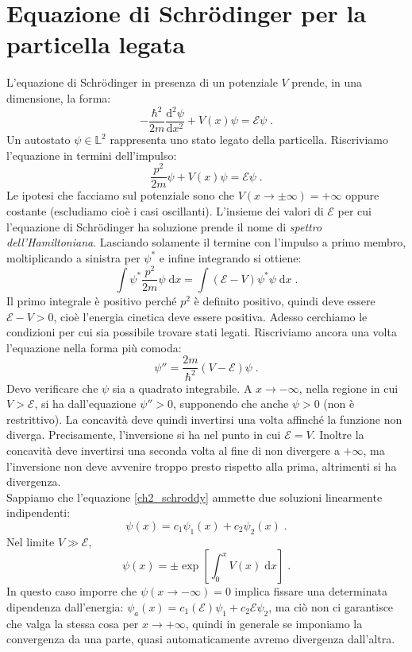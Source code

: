\documentclass[10pt,a4paper]{report}
\theoremstyle{definition}
\newcommand{\dev}[3][]{\frac{\mathrm{d}^{#1} #2}{\mathrm{d} #3^{#1}}}
\numberwithin{equation}{section}
\newcommand{\diff}[1][]{\mathrm{d}#1}
\begin{document}
\section{Equazione di Schrödinger per la particella legata}
L'equazione di Schrödinger in presenza di un potenziale $V$ prende, in una dimensione, la forma:
\begin{equation}
-\frac{\hbar^2}{2m}\dev[2]{\psi}{x}+V(x)\psi=\mathcal{E}\psi\;.
\end{equation}
Un autostato $\psi\in\mathbb{L}^2$ rappresenta uno stato legato della particella. Riscriviamo l'equazione in termini dell'impulso:
$$
\frac{p^2}{2m}\psi+V(x)\psi=\mathcal{E}\psi\;.
$$
Le ipotesi che facciamo sul potenziale sono che $V(x\to\pm\infty)=+\infty$ oppure costante (escludiamo cioè i casi oscillanti). L'insieme dei valori di $\mathcal{E}$ per cui l'equazione di Schrödinger ha soluzione prende il nome di \textit{spettro dell'Hamiltoniana}. Lasciando solamente il termine con l'impulso a primo membro, moltiplicando a sinistra per $\psi^*$ e infine integrando si ottiene:
\begin{equation}
\int \psi^*\frac{p^2}{2m}\psi\;\diff{x}=\int (\mathcal{E}-V)\psi^*\psi\;\diff{x}\;.
\end{equation}
Il primo integrale è positivo perché $p^2$ è definito positivo, quindi deve essere $\mathcal{E}-V>0$, cioè l'energia cinetica deve essere positiva. Adesso cerchiamo le condizioni per cui sia possibile trovare stati legati. Riscriviamo ancora una volta l'equazione nella forma più comoda:
\begin{equation}
\psi''=\frac{2m}{\hbar^2}(V-\mathcal{E})\psi\;. \label{ch2_schroddy}
\end{equation}
Devo verificare che $\psi$ sia a quadrato integrabile. A $x\to -\infty$, nella regione in cui $V>\mathcal{E}$, si ha dall'equazione $\psi''>0$, supponendo che anche $\psi>0$ (non è restrittivo). La concavità deve quindi invertirsi una volta affinché la funzione non diverga. Precisamente, l'inversione si ha nel punto in cui $\mathcal{E}=V$. Inoltre la concavità deve invertirsi una seconda volta al fine di non divergere a $+\infty$, ma l'inversione non deve avvenire troppo presto rispetto alla prima, altrimenti si ha divergenza. \\
Sappiamo che l'equazione \eqref{ch2_schroddy} ammette due soluzioni linearmente indipendenti:
$$
\psi(x)=c_1\psi_1(x)+c_2\psi_2(x)\;.
$$
Nel limite $V\gg \mathcal{E}$, 
\begin{equation}
\psi(x)=\pm\exp\left[\int_0^x V(x)\;\diff{x}\right]\;.
\end{equation}
In questo caso imporre che $\psi(x\to-\infty)=0$ implica fissare una determinata dipendenza dall'energia: $\psi_a(x)=c_1(\mathcal{E})\psi_1+c_2\mathcal{E}\psi_2$, ma ciò non ci garantisce che valga la stessa cosa per $x\to +\infty$, quindi in generale se imponiamo la convergenza da una parte, quasi automaticamente avremo divergenza dall'altra.
\end{document}
